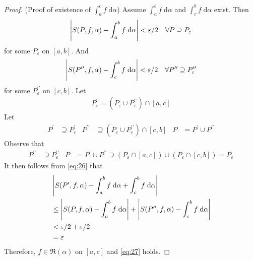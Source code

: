 \documentclass[thmcnt=section, 12pt]{my-elegantbook}
\begin{document}
\begin{proof}
    \par (Proof of existence of $\int_a^c f \; \mathrm{d}\alpha$) Assume $\int_a^b f \; \mathrm{d}\alpha$ and $\int_c^b f \; \mathrm{d}\alpha$ exist. Then 
    \begin{align*}
        \left\lvert S(P, f, \alpha) - \int_a^b f \; \mathrm{d}\alpha \right\rvert < \varepsilon / 2
        \quad \forall P \supseteq P_\varepsilon
    \end{align*}
    for some $P_\varepsilon$ on $[a, b]$. And
    \begin{align*}
        \left\lvert S(P^{\prime\prime}, f, \alpha) - \int_c^b f \; \mathrm{d}\alpha \right\rvert < \varepsilon / 2
        \quad \forall P^{\prime\prime} \supseteq P_\varepsilon^{\prime\prime}
    \end{align*}
    for some $P_\varepsilon^{\prime\prime}$ on $[c, b]$.
    Let
    \begin{align*}
        P_\varepsilon^\prime = (P_\varepsilon \cup P_\varepsilon^{\prime\prime}) \cap [a, c]
    \end{align*}
    Let
    \begin{align*}
        P^\prime &\supseteq P_\varepsilon^\prime &
        P^{\prime\prime} &\supseteq (P_\varepsilon \cup P_\varepsilon^{\prime\prime}) \cap [c, b] &
        P &= P^\prime \cup P^{\prime\prime}
    \end{align*} 
    Observe that 
    \begin{align*}
        P^{\prime\prime} &\supseteq P_\varepsilon^{\prime\prime} &
        P &= P^\prime \cup P^{\prime\prime}
        \supseteq (P_\varepsilon \cap [a, c]) \cup (P_\varepsilon \cap [c, b])
        = P_\varepsilon
    \end{align*}
    It then follows from \eqref{eq:26} that
    \begin{align*}
        &\left\lvert 
            S(P^\prime, f, \alpha)
            - \int_a^b f \; \mathrm{d}\alpha
            + \int_c^b f \; \mathrm{d}\alpha 
         \right\rvert \\ 
        &\leq \left\lvert 
            S(P, f, \alpha)
            - \int_a^b f \; \mathrm{d}\alpha
         \right\rvert + \left\lvert 
            S(P^{\prime\prime}, f, \alpha)
            - \int_c^b f \; \mathrm{d}\alpha
         \right\rvert \\ 
        &< \varepsilon / 2 + \varepsilon / 2 \\ 
        &= \varepsilon
    \end{align*} 
    Therefore, $f \in \mathfrak{R}(\alpha)$ on $[a, c]$ and \eqref{eq:27} holds.

\end{proof}
\end{document}
